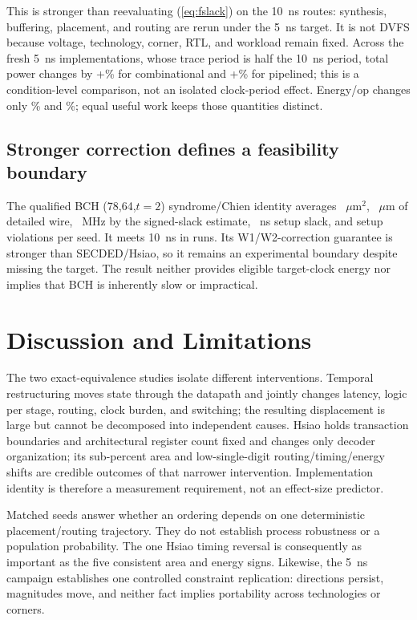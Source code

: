 \documentclass[conference,10pt]{IEEEtran}
\begin{document}
This is stronger than reevaluating (\ref{eq:fslack}) on the 10~ns routes: synthesis, buffering, placement, and routing are rerun under the 5~ns target. It is not DVFS because voltage, technology, corner, RTL, and workload remain fixed. Across the fresh 5~ns implementations, whose trace period is half the 10~ns period, total power changes by +\CombConditionPower\% for combinational and +\PipeConditionPower\% for pipelined; this is a condition-level comparison, not an isolated clock-period effect. Energy/op changes only \CombConditionEnergy\% and \PipeConditionEnergy\%; equal useful work keeps those quantities distinct.

\subsection{Stronger correction defines a feasibility boundary}

The qualified BCH (78,64,$t=2$) syndrome/Chien identity averages \BchArea~$\mu$m$^2$, \BchWire~$\mu$m of detailed wire, \BchFreq~MHz by the signed-slack estimate, \BchSlack~ns setup slack, and \BchSetupViolations{} setup violations per seed. It meets 10~ns in \BchFeasible{} runs. Its W1/W2-correction guarantee is stronger than SECDED/Hsiao, so it remains an experimental boundary despite missing the target. The result neither provides eligible target-clock energy nor implies that BCH is inherently slow or impractical.

\section{Discussion and Limitations}

The two exact-equivalence studies isolate different interventions. Temporal restructuring moves state through the datapath and jointly changes latency, logic per stage, routing, clock burden, and switching; the resulting displacement is large but cannot be decomposed into independent causes. Hsiao holds transaction boundaries and architectural register count fixed and changes only decoder organization; its sub-percent area and low-single-digit routing/timing/energy shifts are credible outcomes of that narrower intervention. Implementation identity is therefore a measurement requirement, not an effect-size predictor.

Matched seeds answer whether an ordering depends on one deterministic placement/routing trajectory. They do not establish process robustness or a population probability. The one Hsiao timing reversal is consequently as important as the five consistent area and energy signs. Likewise, the 5~ns campaign establishes one controlled constraint replication: directions persist, magnitudes move, and neither fact implies portability across technologies or corners.
\end{document}
